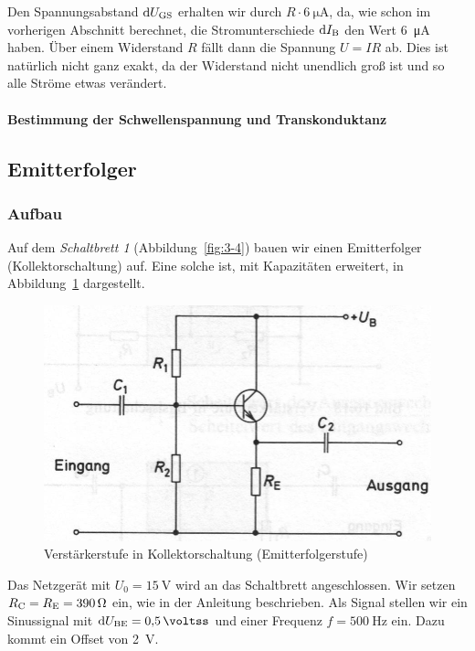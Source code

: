 Den Spannungsabstand $\dif\UGS$ erhalten wir durch $R \cdot
\SI{6}{\micro\ampere}$, da, wie schon im vorherigen Abschnitt berechnet, die
Stromunterschiede $\dif\IB$ den Wert \SI{6}{\micro\ampere} haben. Über einem
Widerstand $R$ fällt dann die Spannung $U = IR$ ab. Dies ist natürlich nicht
ganz exakt, da der Widerstand nicht unendlich groß ist und so alle Ströme etwas
verändert.

\paragraph{Bestimmung der Schwellenspannung und Transkonduktanz}
\label{par:Schwellenspannung}

\fehlt

\FloatBarrier
\subsection{Emitterfolger}

\subsubsection{Aufbau}

Auf dem \emph{Schaltbrett 1} (Abbildung~\ref{fig:3-4}) bauen wir einen
Emitterfolger (Kollektorschaltung) auf. Eine solche ist, mit Kapazitäten
erweitert, in Abbildung~\ref{fig:beuth-bild-16-21} dargestellt.

\begin{figure}[htbp]
	\centering
	\includegraphics[width=.6\textwidth]{beuth-bild-16-21.jpg}
	\caption{%
		Verstärkerstufe in Kollektorschaltung (Emitterfolgerstufe)
		\cite[Bild~16.21]{beuth/elementare_elektronik}
	}
	\label{fig:beuth-bild-16-21}
\end{figure}

Das Netzgerät mit $U_0 = \SI{15}\volt$ wird an das Schaltbrett angeschlossen.
Wir setzen $R_\text{C} = R_\text{E} = \SI{390}\ohm$ ein, wie in der Anleitung beschrieben.
Als Signal stellen wir ein Sinussignal mit $\dif\UBE = \SI{.5}{\voltss}$ und
einer Frequenz $f = \SI{500}\hertz$ ein. Dazu kommt ein Offset von
\SI{2}{\volt}.

